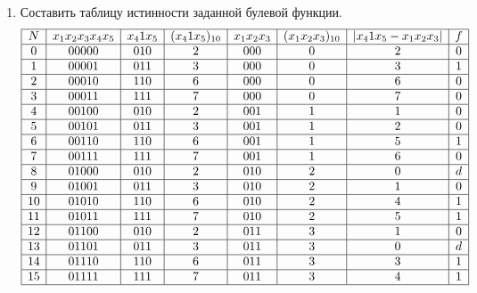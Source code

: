 \documentclass{article}
\begin{document}
\begin{enumerate}
       \item Составить таблицу истинности заданной булевой функции.
             $$\begin{array}{|c|c|c|c|c|c|c|c|c|c|c|} \hline
                           N  & x_1x_2x_3x_4x_5 & x_41x_5 & (x_41x_5)_{10} & x_1x_2x_3 & (x_1x_2x_3)_{10} & |x_4 1 x_5 - x_1x_2x_3| & f \nl
                           0  & 00000           & 010     & 2              & 000       & 0                & 2                       & 0 \nl
                           1  & 00001           & 011     & 3              & 000       & 0                & 3                       & 1 \nl
                           2  & 00010           & 110     & 6              & 000       & 0                & 6                       & 0 \nl
                           3  & 00011           & 111     & 7              & 000       & 0                & 7                       & 0 \nl
                           4  & 00100           & 010     & 2              & 001       & 1                & 1                       & 0 \nl
                           5  & 00101           & 011     & 3              & 001       & 1                & 2                       & 0 \nl
                           6  & 00110           & 110     & 6              & 001       & 1                & 5                       & 1 \nl
                           7  & 00111           & 111     & 7              & 001       & 1                & 6                       & 0 \nl
                           8  & 01000           & 010     & 2              & 010       & 2                & 0                       & d \nl
                           9  & 01001           & 011     & 3              & 010       & 2                & 1                       & 0 \nl
                           10 & 01010           & 110     & 6              & 010       & 2                & 4                       & 1 \nl
                           11 & 01011           & 111     & 7              & 010       & 2                & 5                       & 1 \nl
                           12 & 01100           & 010     & 2              & 011       & 3                & 1                       & 0 \nl
                           13 & 01101           & 011     & 3              & 011       & 3                & 0                       & d \nl
                           14 & 01110           & 110     & 6              & 011       & 3                & 3                       & 1 \nl
                           15 & 01111           & 111     & 7              & 011       & 3                & 4                       & 1 \nl

\end{array}$$
\end{enumerate}
\end{document}
